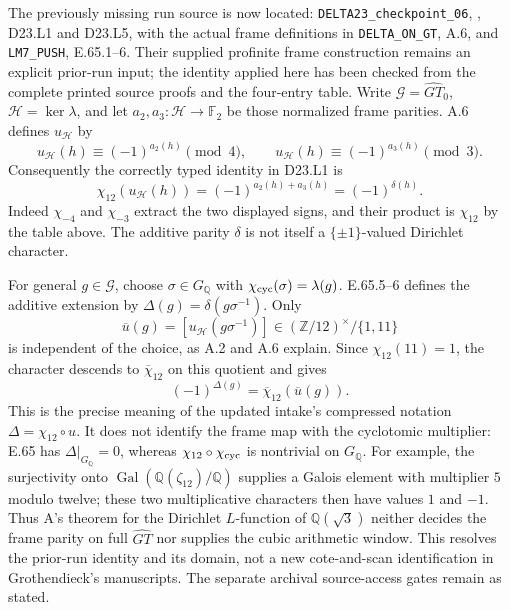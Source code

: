 The previously missing run source is now located:
\texttt{DELTA23\_checkpoint\_06},
, D23.L1 and D23.L5,
with the actual frame definitions in
\texttt{DELTA\_ON\_GT}, A.6, and
\texttt{LM7\_PUSH}, E.65.1--6. Their supplied
profinite frame construction remains an explicit prior-run
input; the identity applied here has been checked from
the complete printed source proofs and the four-entry table.
Write $\mathcal G=\widehat{GT}_0$,
$\mathcal H=\ker\lambda$, and let
$a_2,a_3:\mathcal H\to\mathbb F_2$ be those normalized
frame parities. A.6 defines $u_{\mathcal H}$ by
\[
 u_{\mathcal H}(h)\equiv(-1)^{a_2(h)}\pmod4,
 \qquad
 u_{\mathcal H}(h)\equiv(-1)^{a_3(h)}\pmod3.
\]
Consequently the correctly typed identity in D23.L1 is
\[
 \chi_{12}(u_{\mathcal H}(h))
       =(-1)^{a_2(h)+a_3(h)}=(-1)^{\delta(h)}.
\]
Indeed $\chi_{-4}$ and $\chi_{-3}$ extract the two
displayed signs, and their product is $\chi_{12}$ by
the table above. The additive parity $\delta$ is not
itself a $\{\pm1\}$-valued Dirichlet character.

For general $g\in\mathcal G$, choose
$\sigma\in G_{\mathbb Q}$ with
$\chi_{\rm cyc}(\sigma)=\lambda(g)$.
E.65.5--6 defines the additive extension by
$\Delta(g)=\delta(g\sigma^{-1})$.
Only
\[
 \overline u(g)=[u_{\mathcal H}(g\sigma^{-1})]
       \in(\mathbb Z/12)^\times/\{1,11\}
\]
is independent of the choice, as A.2 and A.6 explain.
Since $\chi_{12}(11)=1$, the character descends to
$\overline\chi_{12}$ on this quotient and gives
\[
 (-1)^{\Delta(g)}=\overline\chi_{12}(\overline u(g)).
\]
This is the precise meaning of the updated intake's
compressed notation $\Delta=\chi_{12}\circ u$.
It does not identify the frame map with the cyclotomic
multiplier: E.65 has $\Delta|_{G_{\mathbb Q}}=0$,
whereas $\chi_{12}\circ\chi_{\rm cyc}$ is nontrivial
on $G_{\mathbb Q}$. For example, the surjectivity onto
$\operatorname{Gal}(\mathbb Q(\zeta_{12})/\mathbb Q)$
supplies a Galois element with multiplier $5$ modulo
twelve; these two multiplicative characters then have
values $1$ and $-1$. Thus A's theorem for the Dirichlet
$L$-function of $\mathbb Q(\sqrt3)$ neither decides the
frame parity on full $\widehat{GT}$ nor supplies the
cubic arithmetic window. This resolves the prior-run
identity and its domain, not a new cote-and-scan
identification in Grothendieck's manuscripts. The
separate archival source-access gates remain as stated.
